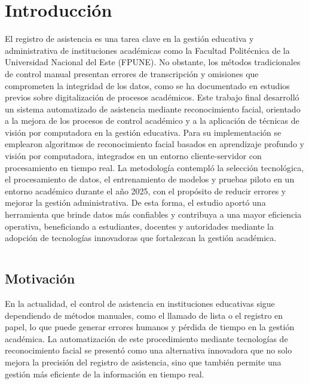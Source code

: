 \fancyhead{}
\fancyfoot{}
\cfoot{\thepage}

\chapter{Introducción}

El registro de asistencia es una tarea clave en la gestión educativa y administrativa de instituciones académicas como la Facultad Politécnica de la Universidad Nacional del Este (FPUNE). No obstante, los métodos tradicionales de control manual presentan errores de transcripción y omisiones que comprometen la integridad de los datos, como se ha documentado en estudios previos sobre digitalización de procesos académicos. Este trabajo final desarrolló un sistema automatizado de asistencia mediante reconocimiento facial, orientado a la mejora de los procesos de control académico y a la aplicación de técnicas de visión por computadora en la gestión educativa.
Para su implementación se emplearon algoritmos de reconocimiento facial basados en aprendizaje profundo y visión por computadora, integrados en un entorno cliente-servidor con procesamiento en tiempo real. La metodología contempló la selección tecnológica, el procesamiento de datos, el entrenamiento de modelos y pruebas piloto en un entorno académico durante el año 2025, con el propósito de reducir errores y mejorar la gestión administrativa. De esta forma, el estudio aportó una herramienta que brinde datos más confiables y contribuya a una mayor eficiencia operativa, beneficiando a estudiantes, docentes y autoridades mediante la adopción de tecnologías innovadoras que fortalezcan la gestión académica.

\begin{table}[]
\begin{tabular}{lllll}
\end{tabular}
\end{table}
\section{Motivación}

En la actualidad, el control de asistencia en instituciones educativas sigue dependiendo de métodos manuales, como el llamado de lista o el registro en papel, lo que puede generar errores humanos y pérdida de tiempo en la gestión académica. La automatización de este procedimiento mediante tecnologías de reconocimiento facial se presentó como una alternativa innovadora que no solo mejora la precisión del registro de asistencia, sino que también permite una gestión más eficiente de la información en tiempo real.

